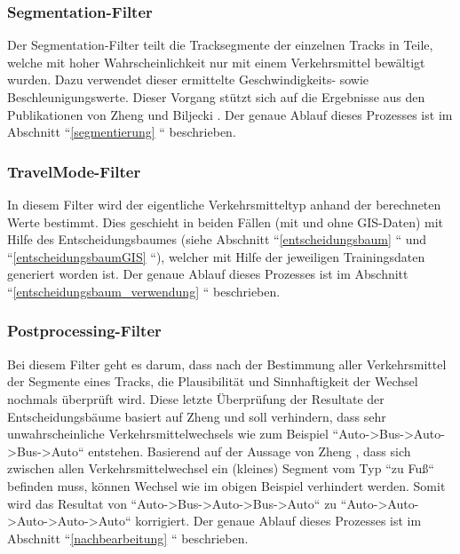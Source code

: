 
\subsubsection{Segmentation-Filter}
Der Segmentation-Filter teilt die Tracksegmente der einzelnen Tracks in Teile, welche mit hoher Wahrscheinlichkeit nur mit einem Verkehrsmittel bewältigt wurden. Dazu verwendet dieser ermittelte Geschwindigkeits- sowie Beschleunigungswerte. Dieser Vorgang stützt sich auf die Ergebnisse aus den Publikationen von Zheng \cite{zheng_understanding_2010} und Biljecki \cite{biljecki_transportation_2013}. Der genaue Ablauf dieses Prozesses ist im Abschnitt ``\ref{segmentierung} `` beschrieben.

\subsubsection{TravelMode-Filter}
In diesem Filter wird der eigentliche Verkehrsmitteltyp anhand der berechneten Werte bestimmt. Dies geschieht in beiden Fällen (mit und ohne GIS-Daten) mit Hilfe des Entscheidungsbaumes (siehe Abschnitt ``\ref{entscheidungsbaum} `` und  ``\ref{entscheidungsbaumGIS} ``), welcher mit Hilfe der jeweiligen Trainingsdaten generiert worden ist. Der genaue Ablauf dieses Prozesses ist im Abschnitt ``\ref{entscheidungsbaum_verwendung} `` beschrieben.

\subsubsection{Postprocessing-Filter}
Bei diesem Filter geht es darum, dass nach der Bestimmung aller Verkehrsmittel der Segmente eines Tracks, die Plausibilität und Sinnhaftigkeit der Wechsel nochmals überprüft wird. Diese letzte Überprüfung der Resultate der Entscheidungsbäume basiert auf Zheng \cite{zheng_understanding_2010} und soll verhindern, dass sehr unwahrscheinliche Verkehrsmittelwechsels wie zum Beispiel ``Auto->Bus->Auto->Bus->Auto`` entstehen. Basierend auf der Aussage von Zheng \cite{zheng_understanding_2010}, dass sich zwischen allen Verkehrsmittelwechsel ein (kleines) Segment vom Typ ``zu Fuß`` befinden muss, können Wechsel wie im obigen Beispiel verhindert werden. Somit wird das Resultat von ``Auto->Bus->Auto->Bus->Auto`` zu ``Auto->Auto->Auto->Auto->Auto`` korrigiert. Der genaue Ablauf dieses Prozesses ist im Abschnitt ``\ref{nachbearbeitung} `` beschrieben.

